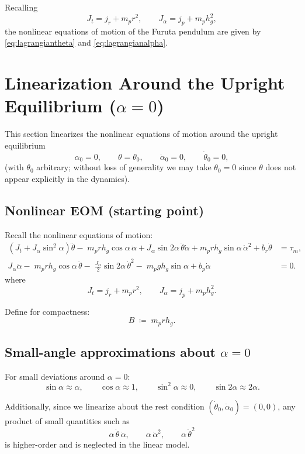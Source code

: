 \documentclass[12pt,a4paper]{article}
\begin{document}
Recalling
\[
J_t=j_r+m_p r^2,
\qquad
J_\alpha=j_p+m_p h_g^2,
\]
the nonlinear equations of motion of the Furuta pendulum are given by
\eqref{eq:lagrangiantheta} and \eqref{eq:lagrangianalpha}.

\section{Linearization Around the Upright Equilibrium ($\alpha=0$)}

This section linearizes the nonlinear equations of motion around the upright equilibrium
\[
\alpha_0 = 0, \qquad \theta=\theta_0, \qquad \dot\alpha_0=0,\qquad \dot\theta_0=0,
\]
(with $\theta_0$ arbitrary; without loss of generality we may take $\theta_0=0$ since $\theta$ does not appear explicitly in the dynamics).

\subsection{Nonlinear EOM (starting point)}

Recall the nonlinear equations of motion:
\begin{align}
\left(J_t+J_\alpha\sin^2\alpha\right)\ddot\theta
-\;m_p r h_g\cos\alpha\,\ddot\alpha
+J_\alpha\sin 2\alpha\,\dot\theta\dot\alpha
+m_p r h_g\sin\alpha\,\dot\alpha^2
+b_r\dot\theta
&=
\tau_m,
\label{eq:eom_theta_nl}\\[6pt]
J_\alpha\ddot\alpha
-\;m_p r h_g\cos\alpha\,\ddot\theta
-\;\frac{J_\alpha}{2}\sin 2\alpha\,\dot\theta^2
-\;m_p g h_g\sin\alpha
+b_p\dot\alpha
&=
0.
\label{eq:eom_alpha_nl}
\end{align}
where
\[
J_t=j_r+m_p r^2,\qquad J_\alpha=j_p+m_p h_g^2.
\]

Define for compactness:
\[
B \;\coloneqq\; m_p r h_g.
\]

\subsection{Small-angle approximations about $\alpha=0$}

For small deviations around $\alpha=0$:
\[
\sin\alpha \approx \alpha,\qquad
\cos\alpha \approx 1,\qquad
\sin^2\alpha \approx 0,\qquad
\sin 2\alpha \approx 2\alpha.
\]

Additionally, since we linearize about the rest condition $(\dot\theta_0,\dot\alpha_0)=(0,0)$,
any product of small quantities such as
\[
\alpha\,\dot\theta\,\dot\alpha,\qquad
\alpha\,\dot\alpha^2,\qquad
\alpha\,\dot\theta^2
\]
is higher-order and is neglected in the linear model.
\end{document}
